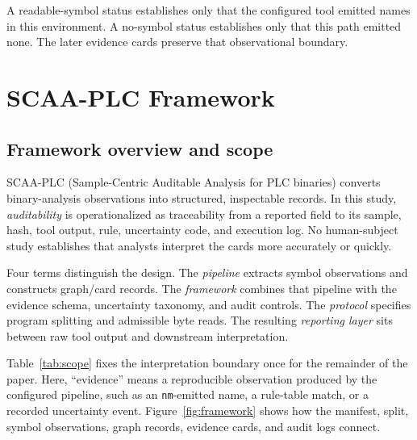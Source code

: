 \documentclass[manuscript,screen,review]{acmart}
\begin{document}
A readable-symbol status establishes only that the configured tool emitted names in this environment. A no-symbol status establishes only that this path emitted none. The later evidence cards preserve that observational boundary.



\section{SCAA-PLC Framework}

\subsection{Framework overview and scope}

SCAA-PLC (Sample-Centric Auditable Analysis for PLC binaries) converts binary-analysis observations into structured, inspectable records. In this study, \emph{auditability} is operationalized as traceability from a reported field to its sample, hash, tool output, rule, uncertainty code, and execution log. No human-subject study establishes that analysts interpret the cards more accurately or quickly.

Four terms distinguish the design. The \emph{pipeline} extracts symbol observations and constructs graph/card records. The \emph{framework} combines that pipeline with the evidence schema, uncertainty taxonomy, and audit controls. The \emph{protocol} specifies program splitting and admissible byte reads. The resulting \emph{reporting layer} sits between raw tool output and downstream interpretation.

Table~\ref{tab:scope} fixes the interpretation boundary once for the remainder of the paper. Here, ``evidence'' means a reproducible observation produced by the configured pipeline, such as an \texttt{nm}-emitted name, a rule-table match, or a recorded uncertainty event. Figure~\ref{fig:framework} shows how the manifest, split, symbol observations, graph records, evidence cards, and audit logs connect.
\end{document}
